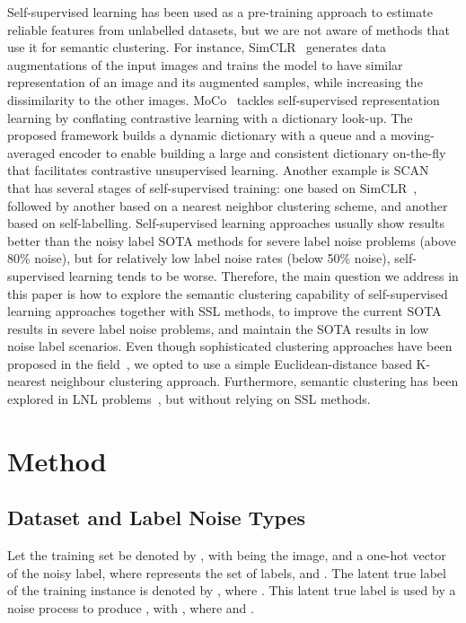 \documentclass[review]{elsarticle}
\theoremstyle{plain}
\begin{document}
Self-supervised learning has been used as a pre-training approach to estimate reliable features from  unlabelled datasets, but we are not aware of methods that use it for semantic clustering.  For instance, SimCLR~\citep{SimCLR} generates data augmentations of the input images and trains the model to have similar representation of an image and its augmented samples, while increasing the dissimilarity to the other images. 
MoCo~\citep{MoCo, MoCoV2} tackles self-supervised representation learning by conflating contrastive learning with a dictionary look-up. The proposed framework builds a dynamic dictionary with a queue and a moving-averaged encoder to enable building a large and consistent dictionary on-the-fly that facilitates contrastive unsupervised learning.
Another example is SCAN~\citep{SCAN} that
has several stages of self-supervised training: one based on SimCLR~\citep{SimCLR}, followed by another based on a nearest neighbor clustering scheme, and another based on self-labelling.
Self-supervised learning approaches usually show results better than the noisy label SOTA methods for severe label noise problems (above 80\% noise), but for relatively low label noise rates (below 50\% noise), self-supervised learning tends to be worse.
Therefore, the main question we address in this paper is how to explore the semantic clustering capability of self-supervised learning approaches together with SSL methods, to improve the current SOTA results in severe label noise problems, and maintain the SOTA results in low noise label scenarios. 
Even though sophisticated clustering approaches have been proposed in the field~\citep{wang2018detecting,wang2020robust,shukla2020semi,han2020unsupervised}, we opted to use a simple Euclidean-distance based K-nearest neighbour clustering approach.
Furthermore, semantic clustering has been explored in LNL problems~\citep{rebbapragada2007class,chiaroni2019hallucinating}, but without relying on SSL methods.

\section{Method}
\label{sec:method}


\subsection{Dataset and Label Noise Types}
\label{sec:dataset_labelnoisetype}


Let the training set be denoted by , with  being the  image, and  a one-hot vector of the noisy label, where  represents the  set of labels, and . 
The latent true label of the  training instance is denoted by , where .
This latent true label is used by a noise process to produce , with ,
where  and .  
\end{document}
